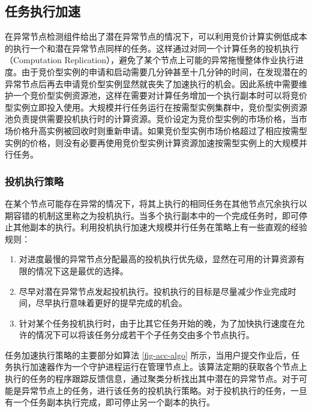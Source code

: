 \subsection{任务执行加速}
在异常节点检测组件给出了潜在异常节点的情况下，可以利用竞价计算实例低成本的执行一个和潜在异常节点同样的任务。这样通过对同一个计算任务的投机执行（Computation Replication），避免了某个节点上可能的异常拖慢整体作业执行进度。由于竞价型实例的申请和启动需要几分钟甚至十几分钟的时间，在发现潜在的异常节点后再去申请竞价型实例显然就丧失了加速执行的机会。因此系统中需要维护一个竞价型实例资源池，这样在需要对计算任务增加一个执行副本时可以将竞价型实例立即投入使用。大规模并行任务运行在按需型实例集群中，竞价型实例资源池负责提供需要投机执行时的计算资源。竞价设定为竞价型实例的市场价格，当市场价格升高实例被回收时则重新申请。如果竞价型实例市场价格超过了相应按需型实例的价格，则没有必要再使用竞价型实例计算资源加速按需型实例上的大规模并行任务。

\subsubsection{投机执行策略}
在某个节点可能存在异常的情况下，将其上执行的相同任务在其他节点冗余执行以期容错的机制这里称之为投机执行。当多个执行副本中的一个完成任务时，即可停止其他副本的执行。利用投机执行加速大规模并行任务在策略上有一些直观的经验规则：
\begin{enumerate}
\item 对进度最慢的异常节点分配最高的投机执行优先级，显然在可用的计算资源有限的情况下这是最优的选择。
\item 尽早对潜在异常节点发起投机执行。投机执行的目标是尽量减少作业完成时间，尽早执行意味着更好的提早完成的机会。
\item 针对某个任务投机执行时，由于比其它任务开始的晚，为了加快执行速度在允许的情况下可以将该任务分成若干个子任务交由多个节点执行。
\end{enumerate}

任务加速执行策略的主要部分如算法 \ref{fig-acc-algo} 所示，当用户提交作业后，任务执行加速器作为一个守护进程运行在管理节点上。该算法定期的获取各个节点上执行的任务的程序跟踪反馈信息，通过聚类分析找出其中潜在的异常节点。对于可能是异常节点上的任务，进行该任务的投机执行策略。对于投机执行的任务，一旦有一个任务副本执行完成，即可停止另一个副本的执行。

